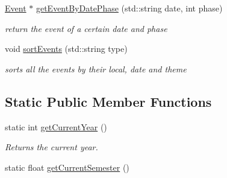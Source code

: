 \begin{DoxyCompactItemize}
\mbox{\hyperlink{classEvent}{Event}} $\ast$ \mbox{\hyperlink{classAssociation_af7345aeb4b38410261527c2f170ad707}{get\+Event\+By\+Date\+Phase}} (std\+::string date, int phase)
\begin{DoxyCompactList}\small\item\em return the event of a certain date and phase \end{DoxyCompactList}\item 
void \mbox{\hyperlink{classAssociation_a1f50c2dd311479652c3c5bb17d3770dc}{sort\+Events}} (std\+::string type)
\begin{DoxyCompactList}\small\item\em sorts all the events by their local, date and theme \end{DoxyCompactList}\end{DoxyCompactItemize}
\subsection*{Static Public Member Functions}
\begin{DoxyCompactItemize}
\item 
static int \mbox{\hyperlink{classAssociation_a92f8779f17716e9dcd206f63f888403c}{get\+Current\+Year}} ()
\begin{DoxyCompactList}\small\item\em Returns the current year. \end{DoxyCompactList}\item 
static float \mbox{\hyperlink{classAssociation_a6d31c13ec77d54a1e814ae9528af694a}{get\+Current\+Semester}} ()
\end{DoxyCompactItemize}
